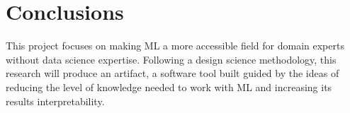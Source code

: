 \documentclass[runningheads]{llncs}
\begin{document}
\section{Conclusions}

This project focuses on making ML a more accessible field for domain experts without data science expertise. 
 Following a design science methodology, this research will produce an artifact, a software tool built guided by the ideas of reducing the level of knowledge needed to work with ML and increasing its results interpretability. 

%
%
%


\end{document}

